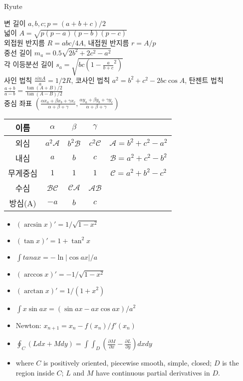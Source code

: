 \documentclass[landscape, 8pt, a4paper, twocolumn]{extarticle} %
\begin{document}
{}{}{}{}{Ryute}

변 길이 $a, b, c; p = (a+b+c)/2$ \\
넓이 $A = \sqrt{p(p-a)(p-b)(p-c)}$ \\
외접원 반지름 $R = abc/4A$, 내접원 반지름 $r = A/p$ \\
중선 길이 $m_a = 0.5\sqrt{2b^2 + 2c^2 - a^2}$ \\
각 이등분선 길이 $s_a = \sqrt{bc(1-\frac{a}{b+c}^2)}$ \\
사인 법칙 $\frac{sin A}{a} = 1/2R$, 코사인 법칙 $a^2 = b^2 + c^2 - 2bc\cos A$, 탄젠트 법칙 $\frac{a+b}{a-b} = \frac{\tan (A+B)/2}{\tan (A-B)/2}$ \\
중심 좌표 $(\frac{\alpha x_a + \beta x_b + \gamma x_c}{\alpha+\beta+\gamma}, \frac{\alpha y_a + \beta y_b + \gamma y_c}{\alpha+\beta+\gamma})$ \\

\begin{tabular}{|c|c|c|c|c|}
    이름 & $\alpha$ & $\beta$ & $\gamma$ & \\ \hline
    외심 & $a^2\mathcal{A}$ & $b^2\mathcal{B}$ & $c^2\mathcal{C}$ & $\mathcal{A}=b^2+c^2-a^2$ \\
    내심 & $a$ & $b$ & $c$ & $\mathcal{B} = a^2 + c^2 - b^2$ \\
    무게중심 & $1$ & $1$ & $1$ & $\mathcal{C} = a^2 + b^2 - c^2$ \\
    수심 & $\mathcal{BC}$ & $\mathcal{CA}$ & $\mathcal{AB}$ & \\
    방심(A) & $-a$ & $b$ & $c$ & 
\end{tabular}

\begin{itemize}
    \setlength\itemsep{0.1em}
    \item $(\arcsin x)'=1/\sqrt{1-x^2}$
    \item $(\tan x)'=1+\tan^2 x$
    \item $\int tan ax=-\ln |\cos ax|/a$
    \item $(\arccos x)'=-1/\sqrt{1-x^2}$
    \item $(\arctan x)'=1/(1+x^2)$
    \item $\int x \sin ax=(\sin ax - ax\cos ax)/a^2$
    \item Newton: $x_{n+1}=x_{n}-f(x_n)/f'(x_n)$
    \item $\oint_C (Ldx+Mdy)=\int\int_D (\frac{\partial M}{\partial x}-\frac{\partial L}{\partial y})dxdy$
    \item where $C$ is positively oriented, piecewise smooth, simple, closed; $D$ is the region inside $C$; $L$ and $M$ have continuous partial derivatives in $D$.
\end{itemize}
\end{document}
